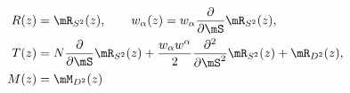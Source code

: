 \begin{equation}
 \begin{split}
 R(z) &= \mR_{S^2}(z),
 \qquad
 w_\alpha(z) = w_\alpha\frac{\partial}{\partial \mS}\mR_{S^2}(z),
 \\
 T(z)
 &=
 N\frac{\partial}{\partial \mS}\mR_{S^2}(z)
 +\frac{w_\alpha w^\alpha}{2}\frac{\partial^2}{\partial \mS^2}\mR_{S^2}(z)
 +\mR_{D^2}(z),
 \\
 M(z)&=\mM_{D^2}(z)
 \end{split}
 \label{eq:relation_b/t_resolvents_U(N)}
\end{equation}

